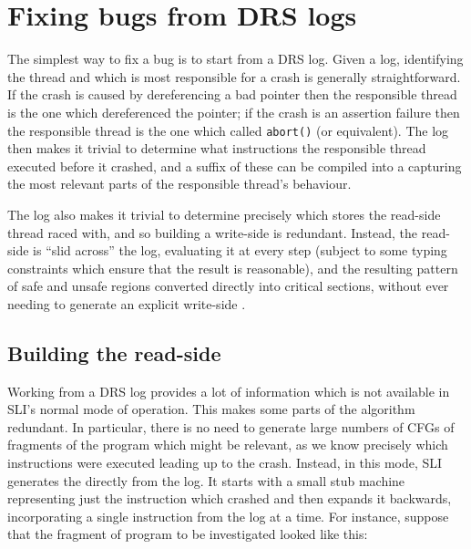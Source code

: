 \section{Fixing bugs from DRS logs}
\label{sect:fix_from_drs}


The simplest way to fix a bug is to start from a DRS log.
Given a log, identifying the thread and which is most responsible for a crash is generally straightforward.
If the crash is caused by dereferencing a bad pointer then the responsible thread is the one which dereferenced the pointer; if the crash is an assertion failure then the responsible thread is the one which called \verb|abort()| (or equivalent).
The log then makes it trivial to determine what instructions the responsible thread executed before it crashed, and a suffix of these can be compiled into a \StateMachine capturing the most relevant parts of the responsible thread's behaviour.

The log also makes it trivial to determine precisely which stores the read-side thread raced with, and so building a write-side \StateMachine is redundant.
Instead, the read-side \StateMachine is ``slid across'' the log, evaluating it at every step (subject to some typing constraints which ensure that the result is reasonable), and the resulting pattern of safe and unsafe regions converted directly into critical sections, without ever needing to generate an explicit write-side \StateMachines.

\subsection{Building the read-side \StateMachine}

Working from a DRS log provides a lot of information which is not available in SLI's normal mode of operation.
This makes some parts of the algorithm redundant.
In particular, there is no need to generate large numbers of CFGs of fragments of the program which might be relevant, as we know precisely which instructions were executed leading up to the crash.
Instead, in this mode, SLI generates the \StateMachine directly from the log.
It starts with a small stub machine representing just the instruction which crashed and then expands it backwards, incorporating a single instruction from the log at a time.
For instance, suppose that the fragment of program to be investigated looked like this:

